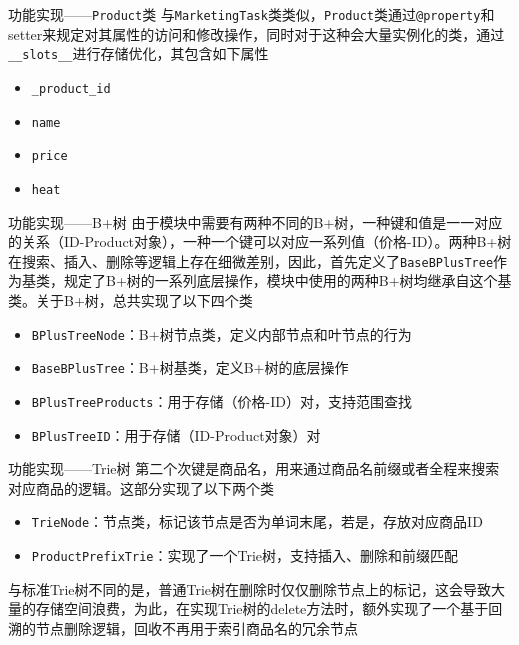 \documentclass[aspectratio=169]{beamer}
\begin{document}
\begin{frame}{功能实现——\texttt{Product}类}
    与\texttt{MarketingTask}类类似，\texttt{Product}类通过\texttt{@property}和setter来规定对其属性的访问和修改操作，同时对于这种会大量实例化的类，通过\texttt{\_\_slots\_\_}进行存储优化，其包含如下属性
    \begin{itemize}
        \item \texttt{\_product\_id}
        \item \texttt{name}
        \item \texttt{price}
        \item \texttt{heat}
    \end{itemize}
\end{frame}

\begin{frame}{功能实现——B+树}
    由于模块中需要有两种不同的B+树，一种键和值是一一对应的关系（ID-Product对象），一种一个键可以对应一系列值（价格-ID）。两种B+树在搜索、插入、删除等逻辑上存在细微差别，因此，首先定义了\texttt{BaseBPlusTree}作为基类，规定了B+树的一系列底层操作，模块中使用的两种B+树均继承自这个基类。关于B+树，总共实现了以下四个类
    \begin{itemize}
        \item \texttt{BPlusTreeNode}：B+树节点类，定义内部节点和叶节点的行为
        \item \texttt{BaseBPlusTree}：B+树基类，定义B+树的底层操作
        \item \texttt{BPlusTreeProducts}：用于存储（价格-ID）对，支持范围查找
        \item \texttt{BPlusTreeID}：用于存储（ID-Product对象）对
    \end{itemize}
\end{frame}

\begin{frame}{功能实现——Trie树}
    第二个次键是商品名，用来通过商品名前缀或者全程来搜索对应商品的逻辑。这部分实现了以下两个类
    \begin{itemize}
        \item \texttt{TrieNode}：节点类，标记该节点是否为单词末尾，若是，存放对应商品ID
        \item \texttt{ProductPrefixTrie}：实现了一个Trie树，支持插入、删除和前缀匹配
    \end{itemize}
    与标准Trie树不同的是，普通Trie树在删除时仅仅删除节点上的标记，这会导致大量的存储空间浪费，为此，在实现Trie树的delete方法时，额外实现了一个基于回溯的节点删除逻辑，回收不再用于索引商品名的冗余节点
\end{frame}
\end{document}
